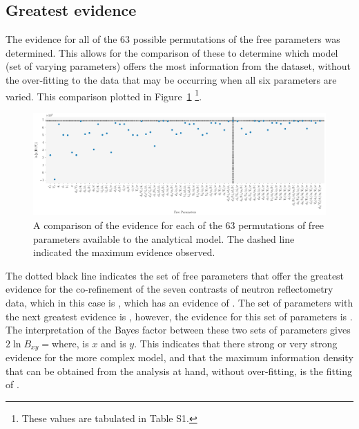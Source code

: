 \documentclass[
 reprint,
 superscriptaddress,
 amsmath,amssymb,
 aps,
]{revtex4-2}
\begin{document}
\subsection{Greatest evidence}
The evidence for all of the \num{63} possible permutations of the free parameters was determined.
This allows for the comparison of these to determine which model (set of varying parameters) offers the most information from the dataset, without the over-fitting to the data that may be occurring when all six parameters are varied. 
This comparison plotted in Figure~\ref{fig:evidence} \footnote{These values are tabulated in Table S1.}. 
%
\begin{figure}
\includegraphics[width=\textwidth]{evidence}
\caption{\label{fig:evidence} A comparison of the evidence for each of the \num{63} permutations of free parameters available to the analytical model. The dashed line indicated the maximum evidence observed.}
\end{figure}
%
The dotted black line indicates the set of free parameters that offer the greatest evidence for the co-refinement of the seven contrasts of neutron reflectometry data, which in this case is \unskip, which has an evidence of \unskip. 
The set of parameters with the next greatest evidence is \unskip, however, the evidence for this set of parameters is \unskip.
The interpretation of the Bayes factor between these two sets of parameters gives $2\ln{B_{xy}}=$\unskip\;where, \unskip\;is $x$ and \unskip\;is $y$. 
This indicates that there strong or very strong evidence for the more complex model, and that the maximum information density that can be obtained from the analysis at hand, without over-fitting, is the fitting of \unskip. 
\end{document}
